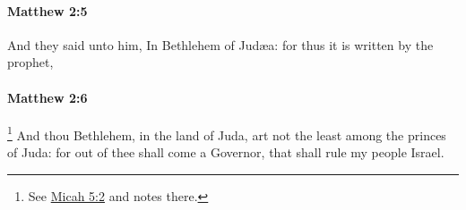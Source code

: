 		\paragraph{Matthew 2:5} %
			\label{MATTHEW-2-5}

			And they said unto him, In Bethlehem of Judæa: for thus it is written by the prophet,

			\begin{framed}
			\scriptsize
				\begin{compactdesc}
					\item[SBLG] 
				\end{compactdesc}
			\end{framed}

		\paragraph{Matthew 2:6} %
			\label{MATTHEW-2-6}

				\footnote{%
					See \hyperref[MICAH-5-2]{Micah 5:2} and notes there.
					}%
			And thou Bethlehem, in the land of Juda, art not the least among the princes of Juda: for out of thee shall come a Governor, that shall rule my people Israel.

